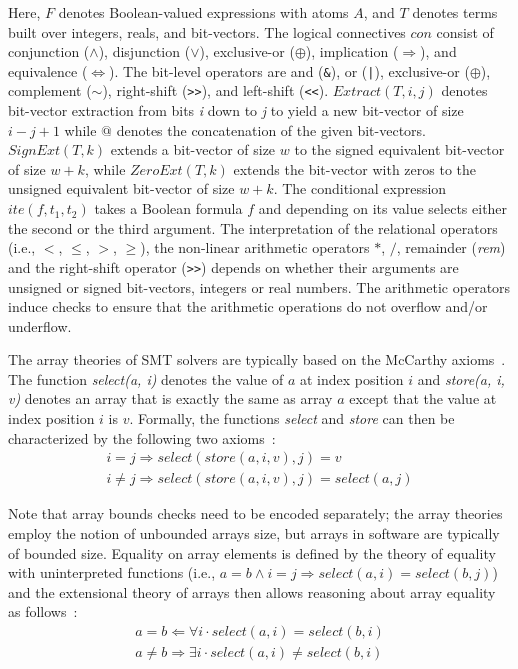 \documentclass[a4paper]{llncs}
\begin{document}
\noindent
Here, $F$ denotes Boolean-valued expressions with atoms $A$, and $T$ denotes terms
built over integers, reals, and bit-vectors.
The logical connectives $\mathit{con}$ consist of conjunction
($\wedge$), disjunction ($\vee$), exclusive-or ($\oplus$), implication
($\Rightarrow$), and equivalence ($\Leftrightarrow$).
The bit-level operators are and
(\texttt{\&}), or (\texttt{|}), exclusive-or ($\oplus$), complement ($\sim$),
right-shift (\texttt{>>}), and left-shift (\texttt{<<}).
$\mathit{Extract}\left(T, i,j\right)$ denotes bit-vector extraction from bits
\textit{i} down to \textit{j} to yield a new bit-vector of size  $i-j+1$ while
$@$ denotes the concatenation of the given bit-vectors.
$\mathit{SignExt}\left(T, k\right)$ extends a bit-vector of size $w$
to the signed
equivalent bit-vector of size $w+k$,
while $\mathit{ZeroExt}\left(T, k\right)$ extends the bit-vector
with zeros to the unsigned equivalent bit-vector of size $w+k$. The conditional
expression $\mathit{ite}(f, t_1, t_2)$ takes a Boolean formula $f$ and
depending on its value selects either the second or the third argument.
The interpretation of the
relational operators (i.e., $<$, $\leq$, $>$, $\geq$), the non-linear
arithmetic operators $*$, $/$, remainder (\emph{rem}) and the right-shift
operator (\texttt{>>}) depends on whether their arguments are unsigned or
signed bit-vectors, integers or real numbers.  The arithmetic operators
induce checks to ensure that the arithmetic operations do not overflow
and/or underflow.

The array theories of SMT solvers are typically based on the
McCarthy axioms~\cite{McCarthy62}. The function \emph{select(a, i)}
denotes the value of $a$ at index position $i$ and \emph{store(a, i, v)}
denotes an array that is exactly the same as array $a$ except that the
value at index position $i$ is $v$. %
Formally, the functions \emph{select} and \emph{store} can then be characterized
by the following two axioms~\cite{CVC07,Boolector09,Z08}:
%
\[
\begin{array}{l}
  i=j      \Rightarrow select\left(store\left(a,i,v\right),j\right)=v \\
  i \neq j \Rightarrow select\left(store\left(a,i,v\right),j\right)=select\left(a,j\right)
\end{array}
\]

\noindent
Note that array bounds checks need to be encoded separately; the array theories employ
the notion of unbounded arrays size, but arrays in software are typically of bounded size.
\noindent Equality on array elements is defined by the theory of equality with uninterpreted
functions (i.e., $a = b \wedge i = j \Rightarrow select\left(a,i\right) = select\left(b,j\right)$)
and the extensional theory of arrays then allows reasoning about array equality as follows~\cite{CVC07,Boolector09,Z08}:
\[
\begin{array}{l}
  a = b    \Leftarrow  \forall i \cdot select\left(a,i\right) = select\left(b,i\right)  \\
  a \neq b \Rightarrow \exists i \cdot select\left(a,i\right) \neq select\left(b,i\right)
\end{array}
\]
\end{document}
